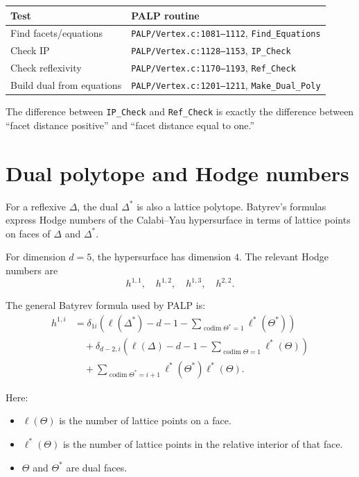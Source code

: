 \documentclass[11pt]{article}
\begin{document}
\begin{center}
\begin{tabular}{@{}ll@{}}
\toprule
Test & PALP routine \\
\midrule
Find facets/equations & \texttt{PALP/Vertex.c:1081--1112}, \texttt{Find\_Equations} \\
Check IP & \texttt{PALP/Vertex.c:1128--1153}, \texttt{IP\_Check} \\
Check reflexivity & \texttt{PALP/Vertex.c:1170--1193}, \texttt{Ref\_Check} \\
Build dual from equations & \texttt{PALP/Vertex.c:1201--1211}, \texttt{Make\_Dual\_Poly} \\
\bottomrule
\end{tabular}
\end{center}

The difference between \texttt{IP\_Check} and \texttt{Ref\_Check} is exactly the difference between ``facet distance positive'' and ``facet distance equal to one.''

\section{Dual polytope and Hodge numbers}

For a reflexive \(\Delta\), the dual \(\Delta^*\) is also a lattice polytope. Batyrev's formulas express Hodge numbers of the Calabi--Yau hypersurface in terms of lattice points on faces of \(\Delta\) and \(\Delta^*\).

For dimension \(d=5\), the hypersurface has dimension \(4\). The relevant Hodge numbers are
\[
h^{1,1},\quad h^{1,2},\quad h^{1,3},\quad h^{2,2}.
\]

The general Batyrev formula used by PALP is:
\[
\begin{aligned}
h^{1,i}
&=
\delta_{1i}
\left(
\ell(\Delta^*)-d-1
-\sum_{\operatorname{codim}\Theta^*=1}\ell^*(\Theta^*)
\right) \\
&\quad+
\delta_{d-2,i}
\left(
\ell(\Delta)-d-1
-\sum_{\operatorname{codim}\Theta=1}\ell^*(\Theta)
\right) \\
&\quad+
\sum_{\operatorname{codim}\Theta^*=i+1}
\ell^*(\Theta^*)\ell^*(\Theta).
\end{aligned}
\]

Here:
\begin{itemize}
  \item \(\ell(\Theta)\) is the number of lattice points on a face.
  \item \(\ell^*(\Theta)\) is the number of lattice points in the relative interior of that face.
  \item \(\Theta\) and \(\Theta^*\) are dual faces.
\end{itemize}
\end{document}
